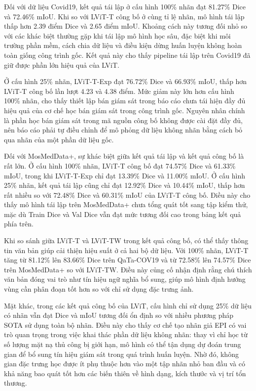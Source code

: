 Đối với dữ liệu Covid19, kết quả tái lập ở cấu hình 100\% nhãn đạt 81.27\% Dice và 72.46\% mIoU. Khi so với LViT-T công bố ở cùng tỉ lệ nhãn, mô hình tái lập thấp hơn 2.39 điểm Dice và 2.65 điểm mIoU. Khoảng cách này tương đối nhỏ so với các khác biệt thường gặp khi tái lập mô hình học sâu, đặc biệt khi môi trường phần mềm, cách chia dữ liệu và điều kiện dừng huấn luyện không hoàn toàn giống công trình gốc. Kết quả này cho thấy pipeline tái lập trên Covid19 đã giữ được phần lớn hiệu quả của LViT.

Ở cấu hình 25\% nhãn, LViT-T-Exp đạt 76.72\% Dice và 66.93\% mIoU, thấp hơn LViT-T công bố lần lượt 4.23 và 4.38 điểm. Mức giảm này lớn hơn cấu hình 100\% nhãn, cho thấy thiết lập bán giám sát trong báo cáo chưa tái hiện đầy đủ hiệu quả của cơ chế học bán giám sát trong công trình gốc. Nguyên nhân chính là phần học bán giám sát trong mã nguồn công bố không được cài đặt đầy đủ, nên báo cáo phải tự điều chỉnh để mô phỏng dữ liệu không nhãn bằng cách bỏ qua nhãn của một phần dữ liệu gốc.

Đối với MosMedData+, sự khác biệt giữa kết quả tái lập và kết quả công bố là rất lớn. Ở cấu hình 100\% nhãn, LViT-T công bố đạt 74.57\% Dice và 61.33\% mIoU, trong khi LViT-T-Exp chỉ đạt 13.39\% Dice và 11.00\% mIoU. Ở cấu hình 25\% nhãn, kết quả tái lập cũng chỉ đạt 12.92\% Dice và 10.44\% mIoU, thấp hơn rất nhiều so với 72.48\% Dice và 60.31\% mIoU của LViT-T công bố. Điều này cho thấy mô hình tái lập trên MosMedData+ chưa tổng quát tốt sang tập kiểm thử, mặc dù Train Dice và Val Dice vẫn đạt mức tương đối cao trong bảng kết quả phía trên.

Khi so sánh giữa LViT-T và LViT-TW trong kết quả công bố, có thể thấy thông tin văn bản giúp cải thiện hiệu suất ở cả hai bộ dữ liệu. Với 100\% nhãn, LViT-T tăng từ 81.12\% lên 83.66\% Dice trên QaTa-COV19 và từ 72.58\% lên 74.57\% Dice trên MosMedData+ so với LViT-TW. Điều này củng cố nhận định rằng chú thích văn bản đóng vai trò như tín hiệu ngữ nghĩa bổ sung, giúp mô hình định hướng vùng cần phân đoạn tốt hơn so với chỉ sử dụng đặc trưng ảnh.

Mặt khác, trong các kết quả công bố của LViT, cấu hình chỉ sử dụng 25\% dữ liệu có nhãn vẫn đạt Dice và mIoU tương đối ổn định so với nhiều phương pháp SOTA sử dụng toàn bộ nhãn. Điều này cho thấy cơ chế tạo nhãn giả EPI có vai trò quan trọng trong việc khai thác phần dữ liệu không nhãn: thay vì chỉ học từ số lượng mặt nạ thủ công bị giới hạn, mô hình có thể tận dụng dự đoán trung gian để bổ sung tín hiệu giám sát trong quá trình huấn luyện. Nhờ đó, không gian đặc trưng học được ít phụ thuộc hơn vào một tập nhãn nhỏ ban đầu và có khả năng bao quát tốt hơn các biến thiên về hình dạng, kích thước và vị trí tổn thương.

